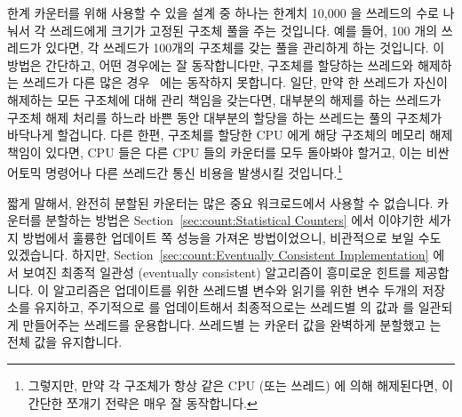 \begin{lineref}
한계 카운터를 위해 사용할 수 있을 설계 중 하나는 한계치 10,000 을 쓰레드의 수로
나눠서 각 쓰레드에게 크기가 고정된 구조체 풀을 주는 것입니다.
예를 들어, 100 개의 쓰레드가 있다면, 각 쓰레드가 100개의 구조체를 갖는 풀을
관리하게 하는 것입니다.
이 방법은 간단하고, 어떤 경우에는 잘 동작합니다만, 구조체를 할당하는 쓰레드와
해제하는 쓰레드가 다른 많은 경우~\cite{McKenney93} 에는 동작하지 못합니다.
일단, 만약 한 쓰레드가 자신이 해제하는 모든 구조체에 대해 관리 책임을 갖는다면,
대부분의 해제를 하는 쓰레드가 구조체 해제 처리를 하느라 바쁜 동안 대부분의
할당을 하는 쓰레드는 풀의 구조체가 바닥나게 할겁니다.
다른 한편, 구조체를 할당한 CPU 에게 해당 구조체의 메모리 해제 책임이 있다면,
CPU 들은 다른 CPU 들의 카운터를 모두 돌아봐야 할거고, 이는 비싼 어토믹 명령어나
다른 쓰레드간 통신 비용을 발생시킬 것입니다.\footnote{
	그렇지만, 만약 각 구조체가 항상 같은 CPU (또는 쓰레드) 에 의해
	해제된다면, 이 간단한 쪼개기 전략은 매우 잘 동작합니다.}

짧게 말해서, 완전히 분할된 카운터는 많은 중요 워크로드에서 사용할 수 없습니다.
카운터를 분할하는 방법은 Section~\ref{sec:count:Statistical Counters} 에서
이야기한 세가지 방법에서 훌륭한 업데이트 쪽 성능을 가져온 방법이었으니,
비관적으로 보일 수도 있겠습니다.
하지만, Section~\ref{sec:count:Eventually Consistent Implementation} 에서
보여진 최종적 일관성 (eventually consistent) 알고리즘이 흥미로운 힌트를
제공합니다.
이 알고리즘은 업데이트를 위한 쓰레드별  변수와 읽기를 위한
 변수 두개의 저장소를 유지하고, 주기적으로 
를 업데이트해서 최종적으로는 쓰레드별  의 값과  를
일관되게 만들어주는  쓰레드를 운용합니다.
쓰레드별  는 카운터 값을 완벽하게 분할했고  는
전체 값을 유지합니다.
\iffalse


\end{lineref}
